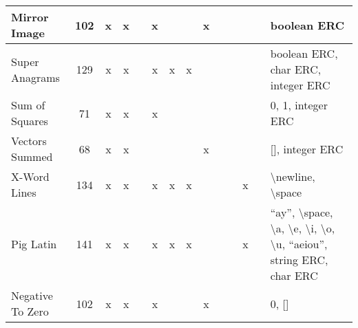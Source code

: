 \documentclass{sig-alternate}
\begin{document}
\begin{table*}[t]
\begin{tabular}{|>{\raggedright}p{3.1cm}|c|ccccccccccc|>{\raggedright}p{5.5cm}|}
\hline
Mirror Image               & 102             & x    & x       &       & x       &      &        & x                  &                  &                   &       &            & boolean ERC                                                                                                                                                                                                                 \tabularnewline
\hline
Super Anagrams             & 129             & x    & x       &       & x       & x    & x      &                    &                  &                   &       &            & boolean ERC, char ERC, integer ERC                                                                                                                                                                                          \tabularnewline
\hline
Sum of Squares             & 71              & x    & x       &       & x       &      &        &                    &                  &                   &       &            & 0, 1, integer ERC                                                                                                                                                                                                           \tabularnewline
\hline
Vectors Summed             & 68              & x    & x       &       &         &      &        & x                  &                  &                   &       &            & {[}{]}, integer ERC                                                                                                                                                                                                         \tabularnewline
\hline
X-Word Lines               & 134             & x    & x       &       & x       & x    & x      &                    &                  &                   & x     &            & \textbackslash newline, \textbackslash space                                                                                                                                                                                \tabularnewline
\hline
Pig Latin                  & 141             & x    & x       &       & x       & x    & x      &                    &                  &                   & x     &            & ``ay'', \textbackslash space, \textbackslash a, \textbackslash e, \textbackslash i, \textbackslash o, \textbackslash u, ``aeiou'', string ERC, char ERC                                                                         \tabularnewline
\hline
Negative To Zero           & 102             & x    & x       &       & x       &      &        & x                  &                  &                   &       &            & 0, {[}{]}                                                                                                                                                                                                                   \tabularnewline

\end{tabular}
\end{table*}
\end{document}
